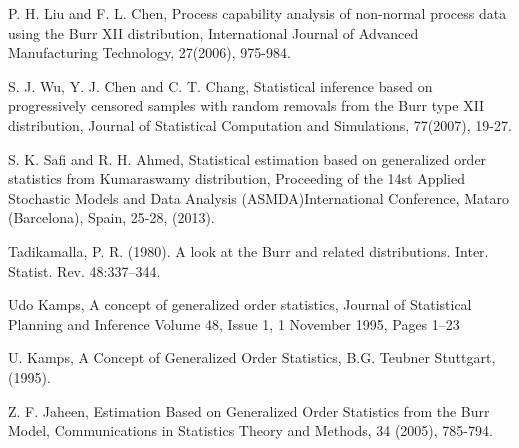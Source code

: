 \documentclass[a4paper, 11pt]{article}
\numberwithin{equation}{section}
\begin{document}
\begin{thebibliography}{99}
\bibitem{}P. H. Liu and F. L. Chen, Process capability analysis of non-normal process data using the Burr XII distribution, International Journal of Advanced Manufacturing Technology, 27(2006), 975-984.

\bibitem{}S. J. Wu, Y. J. Chen and C. T. Chang, Statistical inference based on progressively censored samples with random removals from the Burr type XII distribution, Journal of Statistical Computation and Simulations, 77(2007), 19-27.

\bibitem{}S. K. Safi and R. H. Ahmed, Statistical estimation based on generalized order statistics from Kumaraswamy distribution, Proceeding of the 14st Applied Stochastic Models and Data Analysis (ASMDA)International Conference, Mataro (Barcelona), Spain, 25-28, (2013).

\bibitem{}Tadikamalla, P. R. (1980). A look at the Burr and related distributions. Inter. Statist. Rev. 48:337–344.

\bibitem{}Udo Kamps, A concept of generalized order statistics, Journal of Statistical Planning and Inference Volume 48, Issue 1, 1 November 1995, Pages 1–23

\bibitem{} U. Kamps, A Concept of Generalized Order Statistics, B.G. Teubner Stuttgart, (1995).

\bibitem{}Z. F. Jaheen,  Estimation Based on Generalized Order Statistics from the Burr Model, Communications in Statistics Theory and Methods, 34 (2005), 785-794.


\end{thebibliography}
\end{document}
